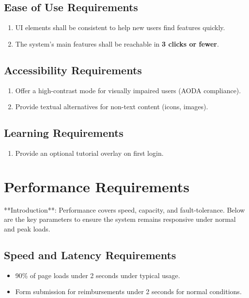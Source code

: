 \documentclass[12pt]{article}
\begin{document}
\subsection{Ease of Use Requirements}
\begin{enumerate}
  \item UI elements shall be consistent to help new users find features quickly.
  \item The system’s main features shall be reachable in \textbf{3 clicks or fewer}.
\end{enumerate}

\subsection{Accessibility Requirements}
\begin{enumerate}
  \item Offer a high-contrast mode for visually impaired users (AODA compliance).
  \item Provide textual alternatives for non-text content (icons, images).
\end{enumerate}

\subsection{Learning Requirements}
\begin{enumerate}
  \item Provide an optional tutorial overlay on first login.
\end{enumerate}

\section{Performance Requirements}
**Introduction**: Performance covers speed, capacity, and fault-tolerance. Below are the key parameters to ensure the system remains responsive under normal and peak loads.

\subsection{Speed and Latency Requirements}
\begin{itemize}
    \item 90\% of page loads under 2 seconds under typical usage.
    \item Form submission for reimbursements under 2 seconds for normal conditions.
\end{itemize}
\end{document}
